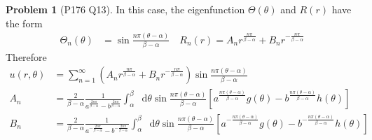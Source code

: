 \documentclass[twoside,11pt]{article}
\renewcommand*\d{\mathop{}\!\mathrm{d}}
\theoremstyle{definition}
\newtheorem{problem}{Problem}
\theoremstyle{remark}
\begin{document}
\begin{problem}[P176 Q13]
In this case, the eigenfunction $\Theta(\theta)$ and $R(r)$ have the form
\begin{align*}
    \Theta_n(\theta) &= \sin\frac{n\pi(\theta-\alpha)}{\beta - \alpha}\quad
    R_n(r) = A_n r^{\frac{n\pi}{\beta-\alpha}} + B_n r^{-\frac{n\pi}{\beta-\alpha}}
\end{align*}
Therefore
\begin{align*}
    u(r, \theta) &=
    \sum_{n=1}^\infty \left(
        A_n r^{\frac{n\pi}{\beta-\alpha}} + B_n r^{-\frac{n\pi}{\beta-\alpha}}
    \right)\sin\frac{n\pi(\theta-\alpha)}{\beta-\alpha}
    \\
    A_n &= \frac{2}{\beta-\alpha}\frac{1}{a^{\frac{2n\pi}{\beta-\alpha}}
    - b^{\frac{2n\pi}{\beta-\alpha}}}
    \int_\alpha^\beta \d\theta\sin\frac{n\pi(\theta-\alpha)}{\beta-\alpha}[
        a^{\frac{n\pi (\theta-\alpha)}{\beta-\alpha}}g(\theta) - 
        b^{\frac{n\pi (\theta-\alpha)}{\beta-\alpha}}h(\theta)
    ]
    \\
    B_n &= \frac{2}{\beta-\alpha}\frac{1}{a^{-\frac{2n\pi}{\beta-\alpha}}
    - b^{-\frac{2n\pi}{\beta-\alpha}}}
    \int_\alpha^\beta \d\theta\sin\frac{n\pi(\theta-\alpha)}{\beta-\alpha}[
        a^{-\frac{n\pi (\theta-\alpha)}{\beta-\alpha}}g(\theta) - 
        b^{-\frac{n\pi (\theta-\alpha)}{\beta-\alpha}}h(\theta)
    ]
\end{align*}
\end{problem}



\end{document}
